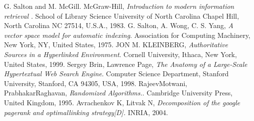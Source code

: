 \documentclass[lettersize,journal,12pt,conference]{IEEEtran}
\begin{document}
\begin{thebibliography}{1}

	G. Salton and M. McGill. McGraw-Hill, {\it{Introduction to modern information retrieval }}. School of Library Science University of North Carolina Chapel Hill, North Carolina NC 27514, U.S.A., 1983. 
    G. Salton, A. Wong, C. S. Yang, {\it{A vector space model for automatic indexing}}. Association for Computing Machinery, New York, NY, United States, 1975.
	JON M. KLEINBERG, {\it{Authoritative Sources in a Hyperlinked Environment}}. Cornell University, Ithaca, New York, United States, 1999.
	Sergey Brin, Lawrence Page, {\it{The Anatomy of a Large-Scale Hypertextual Web
	Search Engine}}. Computer Science Department, Stanford University, Stanford, CA 94305, USA, 1998.
	RajeevMotwani, PrabhakarRaghavan, {\it{Randomized Algorithms.}}. Cambridge University Press, United Kingdom, 1995.
	Avrachenkov K, Litvak N, {\it{Decomposition of the google pagerank and optimallinking strategy[D].}} INRIA, 2004.


\end{thebibliography}
\end{document}
